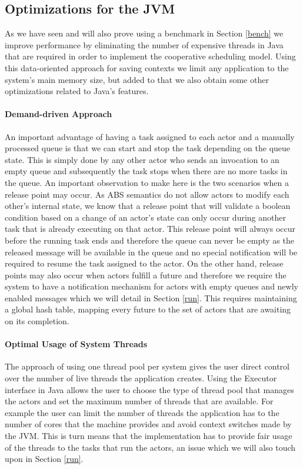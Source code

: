 \subsection{Optimizations for the JVM}
As we have seen and will also prove using a benchmark in Section \ref{bench} we improve performance by eliminating the number of expensive threads in Java that are required in order to implement the cooperative scheduling model. Using this data-oriented approach for saving contexts we limit any application to the system's main memory size, but added to that we also obtain some other optimizations related to Java's features.

\paragraph{Demand-driven Approach}
An important advantage of having a task assigned to each actor and a manually processed queue is that we can start and stop the task depending on the queue state. This is simply done by any other actor who sends an invocation to an empty queue and subsequently the task stops when there are no more tasks in the queue. An important observation to make here is the two scenarios when a release point may occur. As ABS semantics do not allow actors to modify each other's internal state, we know that a release point that will validate a boolean condition based on a change of an actor's state can only occur during another task that is already executing on that actor. This release point will always occur before the running task ends and therefore the queue can never be empty as the released message will be available in the queue and no special notification will be required to resume the task assigned to the actor. On the other hand, release points may also occur when actors fulfill a future and therefore we require the system to have a notification mechanism for actors with empty queues and newly enabled messages which we will detail in Section \ref{run}. This requires maintaining a global hash table, mapping every future to the set of actors that are awaiting on its completion.

\paragraph{Optimal Usage of System Threads}
The approach of using one thread pool per system gives the user direct control over the number of live threads the application creates. Using the Executor interface in Java allows the user to choose the type of thread pool that manages the actors and set the maximum number of threads that are available. For example the user can limit the number of threads the application has to the number of cores that the machine provides and avoid context switches made by the JVM. This is turn means that the implementation has to provide fair usage of the threads to the tasks that run the actors, an issue which we will also touch upon in Section \ref{run}.  

